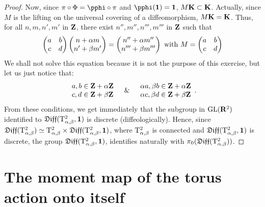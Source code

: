 \begin{proof}
  Now,
  since $\pi \circ \Phi = \pphi \circ \pi$ and $\pphi(\Id)=\Id$,
  $M{\mathbf K} \subset {\mathbf K}$.
  Actually,
  since $M$ is the lifting on the universal covering of a diffeomorphism,
  $M{\mathbf K} = {\mathbf K}$.
  Thus,
  for all $n,m,n',m'$ in $\mathbf{Z}$,
  there exist $n'',m'',n''',m'''$ in $\mathbf{Z}$ such that
  $$%
    \begin{pmatrix}
    a & b \\
    c & d
    \end{pmatrix}
    \begin{pmatrix}
    n+\alpha m \\
    n'+\beta m'
    \end{pmatrix}
    =
    \begin{pmatrix}
    n''+\alpha m'' \\
    n'''+\beta m'''
    \end{pmatrix}
    \SpacedText{with}
    M =
    \begin{pmatrix}
    a & b \\
    c & d
    \end{pmatrix}
    $$%
  We shall not solve this equation because it is not the purpose of this exercise,
  but let us just notice that:
  $$%
    \begin{array}{l}
    a,b \in \ZZ + \alpha \ZZ \\
    c,d \in \ZZ + \beta \ZZ
    \end{array}
    \quad \& \quad
    \begin{array}{l}
    \alpha a,\beta b \in \ZZ + \alpha \ZZ \\
    \alpha c,\beta d \in \ZZ + \beta \ZZ
    \end{array}.
    $$%
  From these conditions,
  we get immediately that the subgroup in $\mathrm{GL}(\mathbf{R}^2)$ identified to $\mathfrak{Diff}(\mathrm{T}^2_{\alpha,\beta},{\mathbf{1}})$ is discrete (diffeologically).
  Hence,
  since $\mathfrak{Diff}(\mathrm{T}^2_{\alpha,\beta}) \simeq \mathrm{T}^2_{\alpha,\beta} \times \mathfrak{Diff}(\mathrm{T}^2_{\alpha,\beta},{\mathbf{1}})$,
  where $\mathrm{T}^2_{\alpha,\beta}$ is connected and $\mathfrak{Diff}(\mathrm{T}^2_{\alpha,\beta},{\mathbf{1}})$ is discrete,
  the group $\mathfrak{Diff}(\mathrm{T}^2_{\alpha,\beta},{\mathbf{1}})$,
  identifies naturally with $\pi_0(\mathfrak{Diff}(\mathrm{T}^2_{\alpha,\beta}))$.
\end{proof}


\section{The moment map of the torus action onto itself}

